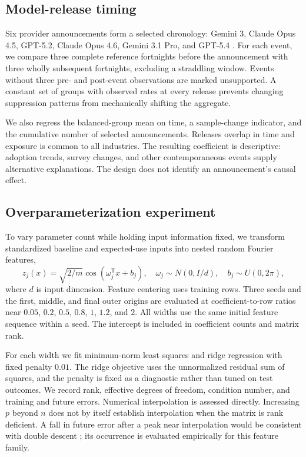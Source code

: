 \documentclass[11pt]{article}
\begin{document}
\subsection{Model-release timing}
Six provider announcements form a selected chronology: Gemini 3, Claude Opus 4.5, GPT-5.2, Claude Opus 4.6, Gemini 3.1 Pro, and GPT-5.4 \cite{gemini3,opus45,gpt52,opus46,gemini31,gpt54}. For each event, we compare three complete reference fortnights before the announcement with three wholly subsequent fortnights, excluding a straddling window. Events without three pre- and post-event observations are marked unsupported. A constant set of groups with observed rates at every release prevents changing suppression patterns from mechanically shifting the aggregate.

We also regress the balanced-group mean on time, a sample-change indicator, and the cumulative number of selected announcements. Releases overlap in time and exposure is common to all industries. The resulting coefficient is descriptive: adoption trends, survey changes, and other contemporaneous events supply alternative explanations. The design does not identify an announcement's causal effect.

\subsection{Overparameterization experiment}
To vary parameter count while holding input information fixed, we transform standardized baseline and expected-use inputs into nested random Fourier features,
\begin{equation}
 z_j(x)=\sqrt{2/m}\cos(\omega_j^{\mathsf T}x+b_j),\quad
 \omega_j\sim N(0,I/d),\quad b_j\sim U(0,2\pi),
\end{equation}
where $d$ is input dimension. Feature centering uses training rows. Three seeds and the first, middle, and final outer origins are evaluated at coefficient-to-row ratios near $0.05$, $0.2$, $0.5$, $0.8$, $1$, $1.2$, and $2$. All widths use the same initial feature sequence within a seed. The intercept is included in coefficient counts and matrix rank.

For each width we fit minimum-norm least squares and ridge regression with fixed penalty $0.01$. The ridge objective uses the unnormalized residual sum of squares, and the penalty is fixed as a diagnostic rather than tuned on test outcomes. We record rank, effective degrees of freedom, condition number, and training and future errors. Numerical interpolation is assessed directly. Increasing $p$ beyond $n$ does not by itself establish interpolation when the matrix is rank deficient. A fall in future error after a peak near interpolation would be consistent with double descent \cite{belkin}; its occurrence is evaluated empirically for this feature family.
\end{document}

